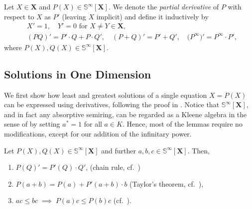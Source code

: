 \documentclass[english,runningheads,a4paper,envcountsame]{llncs}
\newenvironment{Definition}{\definition\upshape}{\enddefinition}
\newcommand{\Sinf}{{\mathbb S}^{\infty}}
\newcommand*{\XX}{{\bm X}}
\begin{document}
\begin{Definition}
Let $X \in \XX$ and $P(X) \in \Sinf[\XX]$.
We denote the \emph{partial derivative} of $P$ with respect to $X$ as $P'$ (leaving $X$ implicit) and define it inductively by
\begin{align*}
    &X' = 1, \quad
    Y' = 0 \text{ for $X \neq Y \in \XX$}, \\
    &(PQ)' = P' \cdot Q + P \cdot Q', \quad
    (P+Q)' = P' + Q', \quad
    \big({P^\infty}\big)' = P^\infty \cdot P',
\end{align*}
where $P(X),Q(X) \in \Sinf[\XX]$.
\end{Definition}


\subsection{Solutions in One Dimension}

We first show how least and greatest solutions of a single equation $X = P(X)$ can be expressed using derivatives, following the proof in \cite{Kleene}.
Notice that $\Sinf[\XX]$, and in fact any absorptive semiring, can be regarded as a Kleene algebra in the sense of \cite{Kleene} by setting $a^* = 1$ for all $a \in K$.
Hence, most of the lemmas require no modifications, except for our addition of the infinitary power.

\begin{lemma}\label{lemChainTaylor}
Let $P(X),Q(X) \in \Sinf[\XX]$ and further $a,b,c \in \Sinf[\XX]$. Then,
\begin{enumerate}
\item $P(Q)' = P'(Q) \cdot Q'$, \hfill (chain rule, cf.\ \cite{Kleene})
\item $P(a+b) = P(a) + P'(a+b) \cdot b$ \hfill (Taylor's theorem, cf.\ \cite{Kleene}),
\item $ac \le bc \;\implies\; P(a) c \le P(b) c $ \hfill (cf.\ \cite{Kleene}).
\end{enumerate}
\end{lemma}
\end{document}

